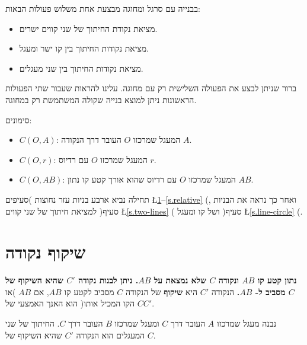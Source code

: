 בבנייה עם סרגל ומחוגה מבצעת אחת משלוש פעולות הבאות:
\begin{itemize}
\item
מציאת נקודת החיתוך של שני קווים ישרים.
\item
מציאת נקודות החיתוך בין קו ישר ומעגל.
\item
מציאת נקודות החיתוך בין שני מעגלים.
\end{itemize}
ברור שניתן לבצע את הפעולה השלישית רק עם מחוגה. עלינו להראות שעבור שתי הפעולות הראשונות ניתן למוצא בנייה שקולה המשתמשת רק במחוגה.


סימונים:
\begin{itemize}
\item $C(O,A)$: 
המעגל שמרכזו
$O$
העובר דרך הנקודה
$A$.
\item $C(O,r)$:
המעגל שמרכזו
$O$
עם רדיוס
$r$.
\item $C(O,AB)$:
המעגל שמרכזו
$O$
עם רדיוס שהוא אורך קטע קו נתון
$AB$.
\end{itemize}

תחילה נביא ארבע בניות עזר נחוצות )סעיפים
\L{\ref{s.reflection}--\ref{s.relative}}%
(,
ואחר כך נראה את הבניות למציאת חיתוך של שני קווים )סעיף
\L{\ref{s.two-lines}}%
( ושל קו ומעגל )סעיף
\L{\ref{s.line-circle}}%
(.

\np

\section{%
שיקוף נקודה%
}\label{s.reflection}
\textbf{%
נתון קטע קו
$AB$
ונקודה 
$C$
שלא נמצאת על
$AB$.
ניתן לבנות נקודה 
$C'$
שהיא השיקוף של
$C$
מסביב ל-%
$AB$.
}
הנקודה
$C'$
היא
\textbf{%
שיקוף%
}
של הנקודה
$C$
מסביב לקטע קו
$AB$,
אם 
$AB$
)או הקו המכיל אותו( הוא האנך האמצעי של
$CC'$.

נבנה מעגל שמרכזו
$A$
העובר דרך
$C$
ומעגל שמרכזו
$B$
העובר דרך
$C$.
החיתוך של שני המעגלים הוא הנקודה
$C'$
שהיא השיקוף של
$C$.

\vspace{-1ex}

\begin{center}
\end{center}

